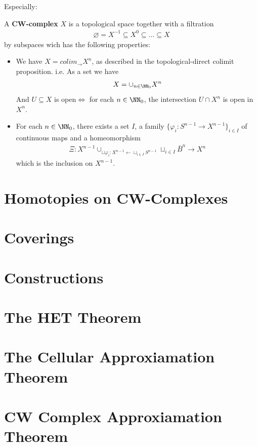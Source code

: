 \documentclass[Total.tex]{subfiles}
\begin{document}
			Especially:
				\begin{Def}
				A \textbf{CW-complex} $X$ is a topological space together with a filtration
				\begin{gather*}
					\varnothing=X^{-1}\subseteq X^0\subseteq \dots\subseteq X
				\end{gather*}
				by subspaces wich has the following properties:
				\begin{itemize}
					\item We have $X=colim_{\rightarrow} X^n$, as described in the topological-direct colimit proposition. i.e. As a set we have
					\begin{gather*}
						X=\cup_{n\in \NN_0} X^n
					\end{gather*}
					And $U\subseteq X$ is open$\Leftrightarrow$ for each $n\in \NN_0$, the intersection $U\cap X^n$ is open in $X^n$.
					\item For each $n\in \NN_0$, there exists a set $I$, a family $\{\varphi_i:S^{n-1}\rightarrow X^{n-1}\}_{i\in I}$ of continuous maps and a homeomorphism
					\begin{gather*}
						\Xi:X^{n-1}\cup_{\sqcup \varphi_i:X^{n-1}\leftarrow \sqcup_{i\in I} S^{n-1}} \sqcup_{i\in I} \bar{B}^n\rightarrow X^n
					\end{gather*}
					which is the inclusion on $X^{n-1}$. 
				\end{itemize}
			\end{Def}
			
			
		\section{Homotopies on CW-Complexes}
		\section{Coverings}
		\section{Constructions}
		\section{The HET Theorem}
		\section{The Cellular Approxiamation Theorem}
		\section{CW Complex Approxiamation Theorem}
\end{document}
